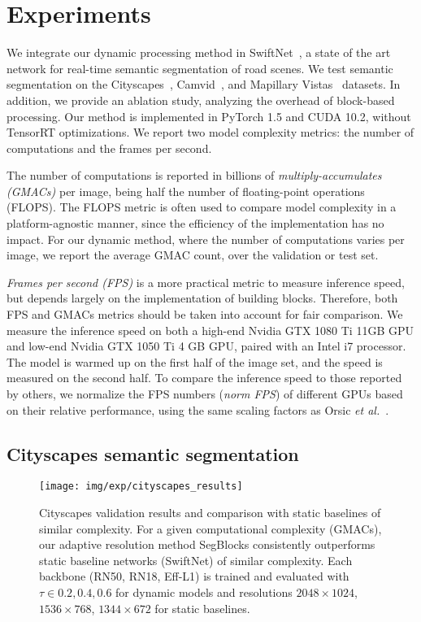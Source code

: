 

\section{Experiments}
We integrate our dynamic processing method in SwiftNet~\cite{orsic_defense_2019}, a state of the art network for real-time semantic segmentation of road scenes. We test semantic segmentation on the Cityscapes~\cite{cordts_cityscapes_2016}, Camvid~\cite{brostow2009semantic_camvid}, and Mapillary Vistas~\cite{neuhold_mapillary_2017} datasets. In addition, we provide an ablation study, analyzing the overhead of block-based processing. Our method is implemented in PyTorch 1.5 and CUDA 10.2, without TensorRT optimizations. We report two model complexity metrics: the number of computations and the frames per second.

{The number of computations} is reported in billions of \emph{multiply-accumulates (GMACs)} per image, being half the number of floating-point operations (FLOPS). The FLOPS metric is often used to compare model complexity in a platform-agnostic manner, since the efficiency of the implementation has no impact. 
For our dynamic method, where the number of computations varies per image, we report the average GMAC count, over the validation or test set.

\emph{Frames per second (FPS)} is a more practical metric to measure inference speed, but depends largely on the implementation of building blocks. 
Therefore, both FPS and GMACs metrics should be taken into account for fair comparison. 
We measure the inference speed on both a high-end Nvidia GTX 1080 Ti 11GB GPU and low-end Nvidia GTX 1050 Ti 4 GB GPU, paired with an Intel i7 processor. The model is warmed up on the first half of the image set, and the speed is measured on the second half. To compare the inference speed to those reported by others, we normalize the FPS numbers (\textit{norm FPS}) of different GPUs based on their relative performance, using the same scaling factors as Orsic \emph{et al.}~\cite{orsic_defense_2019}.

\subsection{Cityscapes semantic segmentation}

\begin{figure}[tb]
\centering
\texttt{[image: img/exp/cityscapes\_results]}
\caption{Cityscapes validation results and comparison with static baselines of similar complexity. For a given computational complexity (GMACs), our adaptive resolution method SegBlocks consistently outperforms static baseline networks (SwiftNet) of similar complexity. Each backbone (RN50, RN18, Eff-L1) is trained and evaluated with $\tau \in {0.2,0.4,0.6}$ for dynamic models and resolutions $2048{\times}1024$, $1536{\times}768$, $1344{\times}672$ for static baselines.  }
\label{fig:cityscapes_results}
\end{figure}



